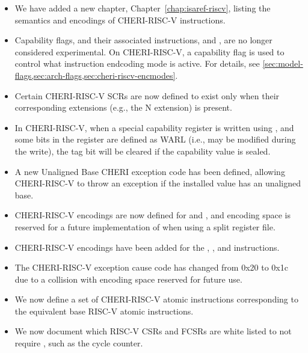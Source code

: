\begin{itemize}
\item We have added a new chapter, Chapter~\ref{chap:isaref-riscv}, listing the
  semantics and encodings of CHERI-RISC-V instructions.

\item Capability flags, and their associated instructions,
   and , are no longer considered
  experimental.
  On CHERI-RISC-V, a capability flag is used to control what instruction
  endcoding mode is active.
  For details, see
  \cref{sec:model-flags,sec:arch-flags,sec:cheri-riscv-encmodes}.

\item Certain CHERI-RISC-V SCRs are now defined to exist only when their
  corresponding extensions (e.g., the N extension) is present.

\item In CHERI-RISC-V, when a special capability register is written using
  , and some bits in the register are defined as WARL
  (i.e., may be modified during the write), the tag bit will be cleared if the
  capability value is sealed.

\item A new Unaligned Base CHERI exception code has been defined, allowing
  CHERI-RISC-V to throw an exception if the installed \PCC{} value has an
  unaligned base.

\item CHERI-RISC-V encodings are now defined for  and
  , and encoding space is reserved for a future implementation of
   when using a split register file.

\item CHERI-RISC-V encodings have been added for the
  , , and
   instructions.

\item The CHERI-RISC-V exception cause code has changed from 0x20 to 0x1c
  due to a collision with encoding space reserved for future use.

\item We now define a set of CHERI-RISC-V atomic instructions corresponding to
  the equivalent base RISC-V atomic instructions.

\item We now document which RISC-V CSRs and FCSRs are white listed to not
  require \cappermASR, such as the cycle counter.


\end{itemize}
